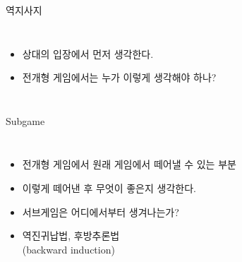 \documentclass[final]{beamer}
\begin{document}
\begin{frame}[t]{역지사지}
	\begin{columns}[c]
	\column{18em}
	\begin{itemize}
		\item 상대의 입장에서 먼저 생각한다. 
		\item 전개형 게임에서는 누가 이렇게 생각해야 하나? 
	\end{itemize}
	\column{15em}\hspace{-2em}
	\end{columns}
\end{frame}

\begin{frame}[t]{Subgame}
	\begin{columns}[c]
	\column{20em}
	\begin{itemize}
		\item 전개형 게임에서 원래 게임에서 떼어낼 수 있는 부분
		\item 이렇게 떼어낸 후 무엇이 좋은지 생각한다. 
		\item 서브게임은 어디에서부터 생겨나는가? 
		\item 역진귀납법, 후방추론법 \\(backward induction)
	\end{itemize}
	\column{15em}
	\end{columns}
\end{frame}
\end{document}
